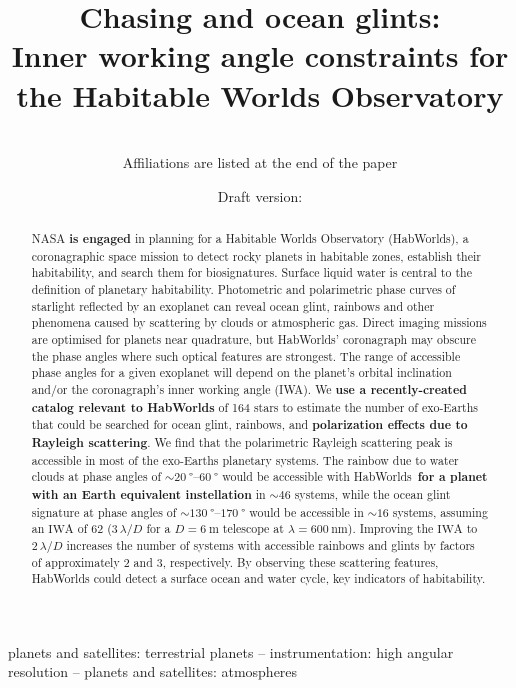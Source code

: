 \documentclass[usenatbib]{mnras}
\title{Chasing \rainbows and ocean glints:\\ Inner working angle constraints for the Habitable Worlds Observatory}
\author[Sophia R. Vaughan et al.]{%
    
    \newauthor 
    \\%
    Affiliations are listed at the end of the paper
}
\date{Draft version: \DTMnow}
\newcommand{\IWA}{\ensuremath{\mathrm{IWA}}\xspace}
\newcommand{\HWO}{HabWorlds\xspace}
\begin{document}
 

\maketitle

\begin{abstract}
NASA {\bf is engaged} in planning for a Habitable Worlds Observatory (\HWO), a coronagraphic space mission to detect rocky planets in habitable zones, establish their habitability, and search them for biosignatures. 
%
Surface liquid water is central to the definition of planetary habitability.
%
Photometric and polarimetric phase curves of starlight reflected by an exoplanet can reveal ocean glint, rainbows and other phenomena caused by scattering by clouds or atmospheric gas.
%
Direct imaging missions are optimised for planets near quadrature, but \HWO' coronagraph may obscure the phase angles where such optical features are strongest. 
%
The range of accessible phase angles for a given exoplanet will depend on the planet's orbital inclination and/or the coronagraph's inner working angle (IWA). 
%
We {\bf use a recently-created catalog relevant to HabWorlds} of 164 stars to estimate the number of exo-Earths that could be searched for ocean glint, rainbows, and {\bf polarization effects due to Rayleigh scattering}. 
%
We find that the polarimetric Rayleigh scattering peak is accessible in most of the exo-Earths planetary systems.
%
The rainbow due to water clouds at phase angles of $\sim\qtyrange{20}{60}{\degree}$ would be accessible with \HWO\ {\bf for a planet with an Earth equivalent instellation} in $\sim\num{46}$ systems, while the ocean glint signature at phase angles of $\sim\qtyrange{130}{170}{\degree}$ would be accessible in $\sim\num{16}$ systems, assuming an \IWA of \qty{62}{\mas} ($3\,\lambda/D$ for a $D=\qty{6}{\meter}$ telescope at $\lambda=\qty{600}{\nano\meter}$).
%
Improving the \IWA to $2\,\lambda/D$ increases the number of systems with accessible rainbows and glints by factors of approximately 2 and 3, respectively.
%
By observing these scattering features, \HWO could detect a surface ocean and water cycle, key indicators of habitability.
\end{abstract}

\begin{keywords}
    planets and satellites: terrestrial planets -- 
    instrumentation: high angular resolution -- 
    planets and satellites: atmospheres
\end{keywords}
\end{document}
